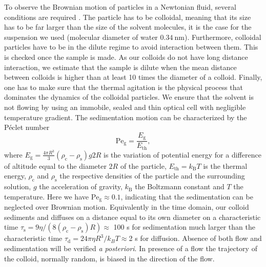 \documentclass[prb,reprint,amsmath,amssymb]{revtex4-1}
\newcommand{\tg}[1]{{\color{magenta}#1}} %
\begin{document}
To observe the Brownian motion of particles in a Newtonian fluid, several conditions are required \citep{16_CollSusp}. The particle has to be colloidal, meaning that its size has to be far larger than the size of the solvent molecules, it is the case for the suspension we used \tg{(molecular diameter of water \citep{17_marcus1998properties}  $\SI{0.34}{\nano\meter}$)}. Furthermore, colloidal particles have to be in the dilute regime to avoid interaction between them. This is checked once the sample is made. As our colloids do not have long distance interaction, we estimate that the sample is dilute when the mean distance between colloids is higher than at least 10 times the diameter of a colloid. Finally, one has to make sure that the thermal agitation is the physical process that dominates the dynamics of the colloidal particles. We ensure that the solvent is not flowing by using an immobile, sealed and thin optical cell with negligible temperature gradient. The sedimentation motion can be characterized by the P\'eclet number \citep{12_patankar1980numerical, ajp2009saka}
\begin{equation}
\text{Pe}_\text{g} = \frac{E_\text{g}}{E_\text{th}},
\end{equation}
where $E_\text{g} = \frac{4 \pi R^3}{3}  (\rho_\text{c} - \rho_\text{s}) g  2R$ is the variation of potential energy for a difference of altitude equal to the diameter $2R$ of the particle, $E_\text{th} = k_\text{B} T$ is the thermal energy, $\rho_\text{c}$ and $\rho_\text{s}$ the respective densities of the particle and the surrounding solution, $g$ the acceleration of gravity, $k_\text{B}$ the Boltzmann constant and $T$ the temperature. Here we have $\text{Pe}_\text{g} \approx 0.1$, indicating that the sedimentation can be neglected over Brownian motion. Equivalently in the time domain, our colloid sediments and diffuses on a distance equal to its own diameter on a characteristic time $\tau_\text{s}=9\eta/(8(\rho_\text{c}-\rho_\text{s}) R)\approx$ 100 s for sedimentation much larger than the characteristic time $\tau_\text{d}=24\pi\eta R^3/k_BT\approx$2 s for diffusion. Absence of both flow and sedimentation will be verified \textit{a posteriori}. In presence of a flow the trajectory of the colloid, normally random, is biased in the direction of the flow.
\end{document}
